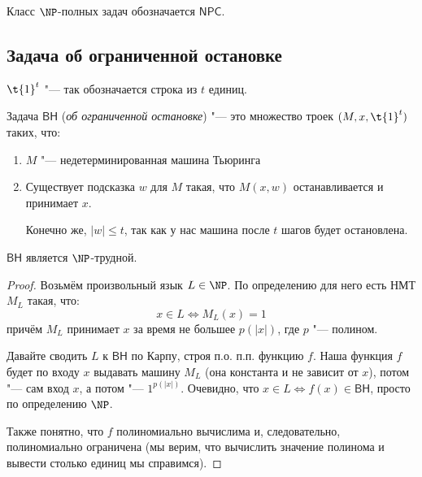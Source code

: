 	\begin{Def}
		Класс $\NP$-полных задач обозначается $\mathsf{NPC}$.
	\end{Def}

\subsection{Задача об ограниченной остановке}
	\begin{Def}
		$\t{1}^t$ "--- так обозначается строка из $t$ единиц.
	\end{Def}
	\begin{Def}
		Задача $\mathsf{BH}$ (\textit{об ограниченной остановке}) "--- это множество троек $(M, x, \t{1}^t)$ таких, что:
		\begin{enumerate}
			\item
				$M$ "--- недетерминированная машина Тьюринга
			\item
				Существует подсказка $w$ для $M$ такая, что $M(x, w)$ останавливается и принимает $x$.
				\begin{Rem}
					Конечно же, $|w| \le t$, так как у нас машина после $t$ шагов будет остановлена.
				\end{Rem}
		\end{enumerate}
	\end{Def}

	\begin{theorem}
		$\mathsf{BH}$ является $\NP$-трудной.
	\end{theorem}
	\begin{proof}
		Возьмём произвольный язык $L \in \NP$.
		По определению для него есть НМТ $M_L$ такая, что:
		\[ x \in L \iff M_L(x) = 1 \]
		причём $M_L$ принимает $x$ за время не большее $p(|x|)$, где $p$ "--- полином.

		Давайте сводить $L$ к $\mathsf{BH}$ по Карпу, строя п.о. п.п. функцию $f$.
		Наша функция $f$ будет по входу $x$ выдавать машину $M_L$ (она константа и не зависит от $x$),
		потом "--- сам вход $x$, а потом "--- $1^{p(|x|)}$.
		Очевидно, что $x \in L \iff f(x) \in \mathsf{BH}$, просто по определению $\NP$.

		Также понятно, что $f$ полиномиально вычислима и, следовательно, полиномиально ограничена
		(мы верим, что вычислить значение полинома и вывести столько единиц мы справимся).
	\end{proof}

